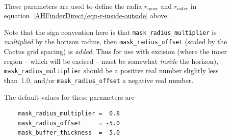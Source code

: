 \begin{description}
\item[%
     \begin{tabular}{@{}l@{}}
     \code{mask\_radius\_multiplier}	\\
     \code{mask\_radius\_offset}	\\
     \code{mask\_buffer\_thickness}	%
     \end{tabular}
     ]
\mbox{}\\
	These parameters are used to define the radia $r_\text{inner}$
	and $r_\text{outer}$ in
	equation~\eqref{AHFinderDirect/eqn-r-inside-outside} above.

	Note that the sign convention here is that
	\verb|mask_radius_multiplier| is {\em multiplied\/}
	by the horizon radius, then \verb|mask_radius_offset|
	(scaled by the Cactus grid spacing) is {\em added\/}.
	Thus for use with excision (where the inner region --
	which will be excised -- must be somewhat {\em inside\/}
	the horizon), \verb|mask_radius_multiplier| should be a
	positive real number slightly less than~1.0, and/or
	\verb|mask_radius_offset| a negative real number.

	The default values for these parameters are
	\begin{verbatim}
	mask_radius_multiplier =  0.8
	mask_radius_offset     = -5.0
	mask_buffer_thickness  =  5.0
	\end{verbatim}


\end{description}
